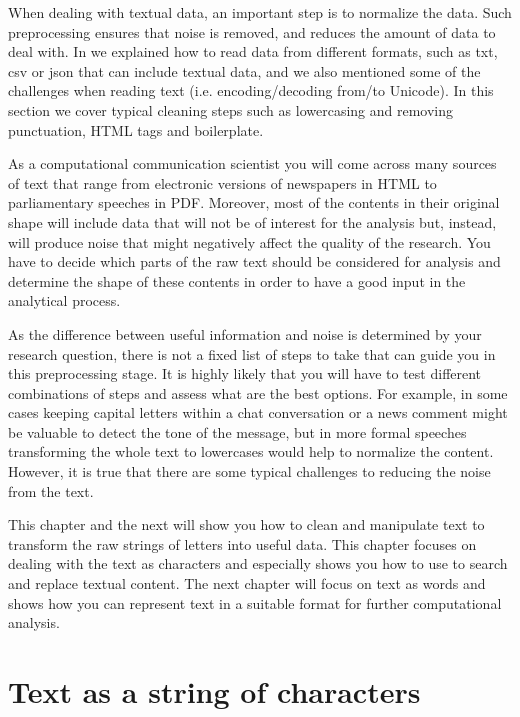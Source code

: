 When dealing with textual data, an important step is to normalize the data. Such preprocessing ensures that noise is removed, and reduces the amount of data to deal with. In  we explained how to read data from different formats, such as txt, csv or json that can include textual data, and we also mentioned some of the challenges when reading text (i.e. encoding/decoding from/to Unicode). In this section we cover typical cleaning steps such as lowercasing and removing punctuation, HTML tags and boilerplate.
 
As a computational communication scientist you will come across many sources of text that range from electronic versions of newspapers in HTML to parliamentary speeches in PDF. Moreover, most of the contents in their original shape will include data that will not be of interest for the analysis but, instead,  will produce noise that might negatively affect the quality of the research. You have to decide which parts of the raw text should be considered for analysis and determine the shape of these contents in order to have a good input in the analytical process. 

As the difference between useful information and noise is determined by your research question, 
there is not a fixed list of steps to take that can guide you in this preprocessing stage.
It is highly likely that you will have to test different combinations of steps and assess what are the best options.
For example, in some cases keeping capital letters within a chat conversation or a news comment might be valuable to detect the tone of the message, but in more formal speeches transforming the whole text to lowercases would help to normalize the content.
However, it is true that there are some typical challenges to reducing the noise from the text.

This chapter and the next will show you how to clean and manipulate text to transform the raw strings of letters into useful data.
This chapter focuses on dealing with the text as characters and especially shows you how to use  to search and replace textual content.
The next chapter will focus on text as words and shows how you can represent text in a suitable format for further computational analysis. 

\section{Text as a string of characters} \label{sec:unicode}

